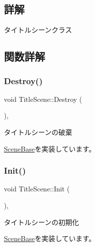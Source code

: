 \subsection{詳解}
タイトルシーンクラス 

\subsection{関数詳解}
\mbox{\label{class_title_scene_adfbc5f934572ede2e36419b089c88fe8}} 
\subsubsection{\texorpdfstring{Destroy()}{Destroy()}}
{\footnotesize\ttfamily void Title\+Scene\+::\+Destroy (\begin{DoxyParamCaption}{ }\end{DoxyParamCaption})\hspace{0.3cm}{\ttfamily [final]}, {\ttfamily [virtual]}}



タイトルシーンの破棄 



\mbox{\hyperlink{class_scene_base_a7c5b54020bc519b4dadfe9770d6b27f7}{Scene\+Base}}を実装しています。

\mbox{\label{class_title_scene_a3d039e7db0fa1e22e8c36d3cedfbd318}} 
\subsubsection{\texorpdfstring{Init()}{Init()}}
{\footnotesize\ttfamily void Title\+Scene\+::\+Init (\begin{DoxyParamCaption}{ }\end{DoxyParamCaption})\hspace{0.3cm}{\ttfamily [final]}, {\ttfamily [virtual]}}



タイトルシーンの初期化 



\mbox{\hyperlink{class_scene_base_a24d7db43c819924dc8b07b436f6d3148}{Scene\+Base}}を実装しています。

\mbox{\label{class_title_scene_af12c59b3bf9458640938c5ca620527ae}} 
